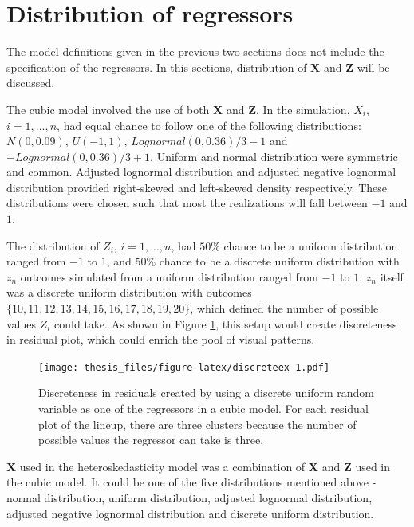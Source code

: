 \documentclass{monashthesis}
\theoremstyle{definition}
\theoremstyle{definition}
\theoremstyle{definition}
\theoremstyle{definition}
\theoremstyle{remark}
\begin{document}
\hypertarget{distribution-of-regressors}{%
\section{Distribution of regressors}\label{distribution-of-regressors}}

The model definitions given in the previous two sections does not include the specification of the regressors. In this sections, distribution of \(\boldsymbol{X}\) and \(\boldsymbol{Z}\) will be discussed.

The cubic model involved the use of both \(\boldsymbol{X}\) and \(\boldsymbol{Z}\). In the simulation, \(X_i\), \(i=1,...,n\), had equal chance to follow one of the following distributions: \(N(0, 0.09)\), \(U(-1, 1)\), \(Lognormal(0,0.36)/3 - 1\) and \(-Lognormal(0,0.36)/3 + 1\). Uniform and normal distribution were symmetric and common. Adjusted lognormal distribution and adjusted negative lognormal distribution provided right-skewed and left-skewed density respectively. These distributions were chosen such that most the realizations will fall between \(-1\) and \(1\).

The distribution of \(Z_i\), \(i=1,...,n\), had \(50\)\% chance to be a uniform distribution ranged from \(-1\) to \(1\), and \(50\)\% chance to be a discrete uniform distribution with \(z_n\) outcomes simulated from a uniform distribution ranged from \(-1\) to \(1\). \(z_n\) itself was a discrete uniform distribution with outcomes \(\{10,11,12,13,14,15,16,17,18,19,20\}\), which defined the number of possible values \(Z_i\) could take. As shown in Figure \ref{fig:discreteex}, this setup would create discreteness in residual plot, which could enrich the pool of visual patterns.

\begin{figure}
\centering
\texttt{[image: thesis\_files/figure-latex/discreteex-1.pdf]}
\caption{\label{fig:discreteex}Discreteness in residuals created by using a discrete uniform random variable as one of the regressors in a cubic model. For each residual plot of the lineup, there are three clusters because the number of possible values the regressor can take is three.}
\end{figure}

\(\boldsymbol{X}\) used in the heteroskedasticity model was a combination of \(\boldsymbol{X}\) and \(\boldsymbol{Z}\) used in the cubic model. It could be one of the five distributions mentioned above - normal distribution, uniform distribution, adjusted lognormal distribution, adjusted negative lognormal distribution and discrete uniform distribution.
\end{document}
